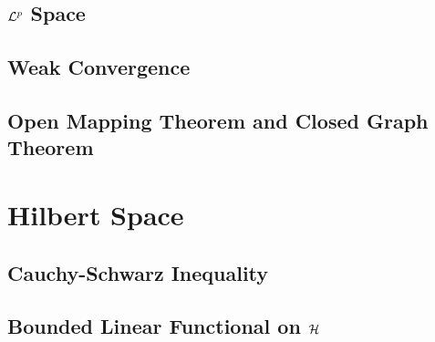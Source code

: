 \documentclass[a4paper, 12pt]{article}
\begin{document}
\subsection{$\mathcal{L}^p$ Space}


\subsection{Weak Convergence}


\subsection{Open Mapping Theorem and Closed Graph Theorem}


\newpage
\section{Hilbert Space}

\subsection{Cauchy-Schwarz Inequality}


\subsection{Bounded Linear Functional on $\mathcal{H}$}

\end{document}
